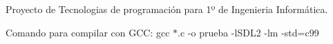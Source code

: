 Proyecto de Tecnologias de programación para 1º de Ingenieria Informática.

Comando para compilar con G\+CC\+: gcc $\ast$.c -\/o prueba -\/l\+S\+D\+L2 -\/lm -\/std=c99 